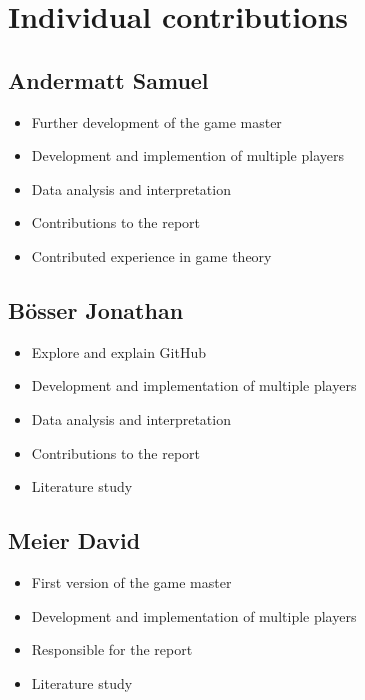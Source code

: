 \section{Individual contributions}

\subsection{Andermatt Samuel}
\begin{itemize}
\item Further development of the game master
\item Development and implemention of multiple players 
\item Data analysis and interpretation
\item Contributions to the report
\item Contributed experience in game theory
\end{itemize}

\subsection{B\"osser Jonathan}
\begin{itemize}
\item Explore and explain GitHub \cite{github}
\item Development and implementation of multiple players 
\item Data analysis and interpretation
\item Contributions to the report
\item Literature study
\end{itemize}

\subsection{Meier David}
\begin{itemize}
\item First version of the game master
\item Development and implementation of multiple players
\item Responsible for the report
\item Literature study
\end{itemize}